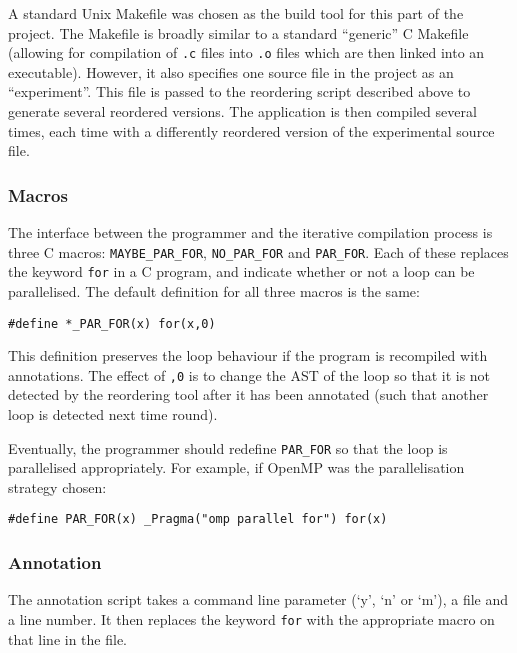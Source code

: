 \documentclass[journal]{IEEEtran}
\begin{document}
A standard Unix Makefile was chosen as the build tool for this part of the
project. The Makefile is broadly similar to a standard ``generic'' C Makefile
(allowing for compilation of \texttt{.c} files into \texttt{.o} files which are
then linked into an executable). However, it also specifies one source file in
the project as an ``experiment''. This file is passed to the reordering script
described above to generate several reordered versions. The application is then
compiled several times, each time with a differently reordered version of the
experimental source file.

\subsubsection{Macros}

The interface between the programmer and the iterative compilation process is
three C macros: \texttt{MAYBE\_PAR\_FOR}, \texttt{NO\_PAR\_FOR} and
\texttt{PAR\_FOR}. Each of these replaces the keyword \texttt{for} in a C
program, and indicate whether or not a loop can be parallelised. The default
definition for all three macros is the same: 

\begin{lstlisting}
#define *_PAR_FOR(x) for(x,0)
\end{lstlisting}

This definition preserves the loop behaviour if the program is recompiled with
annotations. The effect of \texttt{,0} is to change the AST of the loop so that
it is not detected by the reordering tool after it has been annotated (such that
another loop is detected next time round).

Eventually, the programmer should redefine \texttt{PAR\_FOR} so that the loop is
parallelised appropriately. For example, if OpenMP \cite{dagum_openmp:_1998}
was the parallelisation strategy chosen:

\begin{lstlisting}
#define PAR_FOR(x) _Pragma("omp parallel for") for(x)
\end{lstlisting}

\subsubsection{Annotation}

The annotation script takes a command line parameter (`y', `n' or `m'), a file
and a line number. It then replaces the keyword \texttt{for} with the
appropriate macro on that line in the file.
\end{document}
